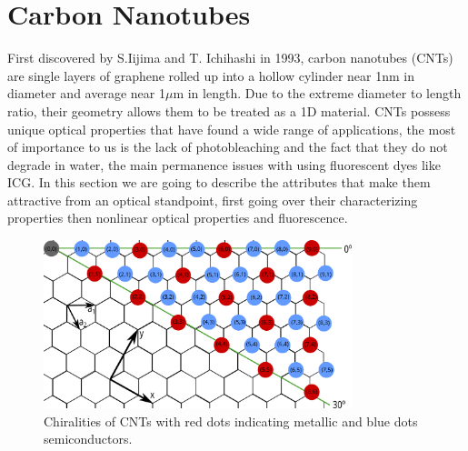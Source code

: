 \chapter{Carbon Nanotubes}
First discovered by S.Iijima and T. Ichihashi in 1993, carbon nanotubes (CNTs) are single layers of graphene rolled up into a hollow cylinder near 1nm in diameter and average near 1$\mu$m in length. Due to the extreme diameter to length ratio, their geometry allows them to be treated as a 1D material. CNTs possess unique optical properties that have found a wide range of applications\cite{yamashita}, the most of importance to us is the lack of photobleaching and the fact that they do not degrade in water, the main permanence issues with using fluorescent dyes like ICG. In this section we are going to describe the attributes that make them attractive from an optical standpoint, first going over their characterizing properties then nonlinear optical properties and fluorescence.
\begin{figure}[htb!]
	\centering
	\includegraphics[width=0.8\textwidth]{./Figures/CNTs/chiral.png}
	\caption{Chiralities of CNTs with red dots indicating metallic and blue dots semiconductors. }
	\label{fig:chiralities}
\end{figure}
